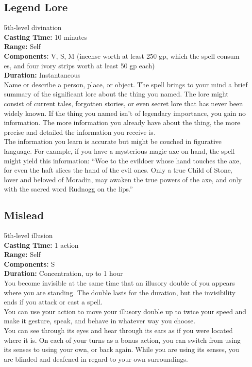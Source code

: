 \documentclass[11pt, A4paper, english]{article}
\begin{document}
		\subsection{Legend Lore}
5th-level divination \\
\textbf{Casting Time:} 10 minutes \\
\textbf{Range:} Self \\
\textbf{Components:} V, S, M (incense worth at least 250 gp, which the spell consum es, and four ivory strips worth at least 50 gp each) \\
\textbf{Duration:} Instantaneous \\
Name or describe a person, place, or object. The spell brings to your mind a brief summary of the significant lore about the thing you named. The lore might consist of current tales, forgotten stories, or even secret lore that has never been widely known. If the thing you named isn’t of legendary importance, you gain no information. The more information you already have about the thing, the more precise and detailed the information you receive is. \\
The information you learn is accurate but might be couched in figurative language. For example, if you have a mysterious magic axe on hand, the spell might yield this information: “Woe to the evildoer whose hand touches the axe, for even the haft slices the hand of the evil ones. Only a true Child of Stone, lover and beloved of Moradin, may awaken the true powers of the axe, and only with the sacred word Rudnogg on the lips.”

		\subsection{Mislead}
5th-level illusion \\
\textbf{Casting Time:} 1 action \\
\textbf{Range:} Self \\
\textbf{Components:} S \\
\textbf{Duration:} Concentration, up to 1 hour \\
You become invisible at the same time that an illusory double of you appears where you are standing. The double lasts for the duration, but the invisibility ends if you attack or cast a spell. \\
You can use your action to move your illusory double up to twice your speed and make it gesture, speak, and behave in whatever way you choose. \\
You can see through its eyes and hear through its ears as if you were located where it is. On each of your turns as a bonus action, you can switch from using its senses to using your own, or back again. While you are using its senses, you are blinded and deafened in regard to your own surroundings.
\end{document}
